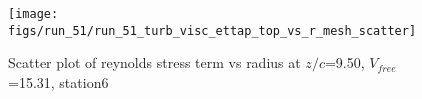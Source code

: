 \begin{figure}[H]
\centering
\texttt{[image: figs/run\_51/run\_51\_turb\_visc\_ettap\_top\_vs\_r\_mesh\_scatter]}
\caption{Scatter plot of reynolds stress term vs radius at $z/c$=9.50, $V_{free}$=15.31, station6}
\label{fig:run_51_turb_visc_ettap_top_vs_r_mesh_scatter}
\end{figure}


